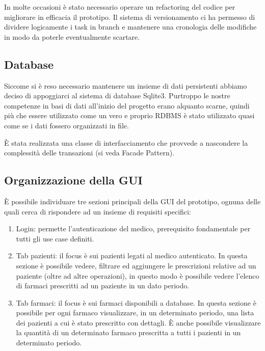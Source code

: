 \documentclass[a4paper, 11pt]{article}
\begin{document}
In molte occasioni è stato necessario operare un refactoring del codice per migliorare in efficacia il prototipo. Il sistema di versionamento ci ha permesso di dividere logicamente i task in branch e mantenere una cronologia delle modifiche in modo da poterle eventualmente scartare.

\subsection{Database}
Siccome si è reso necessario mantenere un insieme di dati persistenti abbiamo deciso di appoggiarci al sistema di database Sqlite3. Purtroppo le nostre competenze in basi di dati all'inizio del progetto erano alquanto scarne, quindi più che essere utilizzato come un vero e proprio RDBMS è stato utilizzato quasi come se i dati fossero organizzati in file.

È stata realizzata una classe di interfacciamento che provvede a nascondere la complessità delle transazioni (si veda Facade Pattern).

\subsection{Organizzazione della GUI}
È possibile individuare tre sezioni principali della GUI del prototipo, ognuna delle quali cerca di rispondere ad un insieme di requisiti specifici:
\begin{enumerate}[label=(\alph*)., nosep]
	\item Login: permette l'autenticazione del medico, prerequisito fondamentale per tutti gli use case definiti. 
	\item Tab pazienti: il focus è sui pazienti legati al medico autenticato. In questa sezione è possibile vedere, filtrare ed aggiungere le prescrizioni relative ad un paziente (oltre ad altre operazioni), in questo modo è possibile vedere l'elenco di farmaci prescritti ad un paziente in un dato periodo.
	\item Tab farmaci: il focus è sui farmaci disponibili a database. In questa sezione è possibile per ogni farmaco visualizzare, in un determinato periodo, una lista dei pazienti a cui è stato prescritto con dettagli. È anche possibile visualizzare la quantità di un determinato farmaco prescritta a tutti i pazienti in un determinato periodo. 
\end{enumerate}
\end{document}
